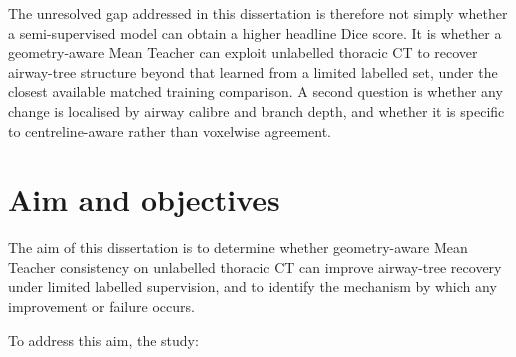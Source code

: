The unresolved gap addressed in this dissertation is therefore not simply whether a
semi-supervised model can obtain a higher headline Dice score. It is whether a
geometry-aware Mean Teacher can exploit unlabelled thoracic CT to recover airway-tree
structure beyond that learned from a limited labelled set, under the closest available matched
training comparison. A second question is whether any change is localised by airway calibre and
branch depth, and whether it is specific to centreline-aware rather than voxelwise agreement.

\section{Aim and objectives}

The aim of this dissertation is to determine whether geometry-aware Mean Teacher consistency
on unlabelled thoracic CT can improve airway-tree recovery under limited labelled supervision,
and to identify the mechanism by which any improvement or failure occurs.

To address this aim, the study:

